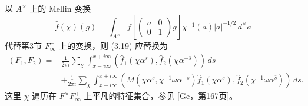 以 $A^\times$ 上的 Mellin 变换
\[
 \widehat f(\chi)(g)=\int_{A^\times}f\!\left[\begin{pmatrix}a&0\\0&1\end{pmatrix}g\right]
 \chi^{-1}(a)|a|^{-1/2}\,d^\times a
\]
代替第3节 $F_\infty^+$ 上的变换，则 (3.19) 应替换为
\begin{equation}
\begin{split}
 (F_1,F_2)={}&\frac1{2\pi i}\sum_\chi\int_{x-i\infty}^{x+i\infty}
 (\widehat f_1(\chi\alpha^s),\widehat f_2(\chi\alpha^{-\bar s}))\,ds\\
 &+\frac1{2\pi i}\sum_\chi\int_{x-i\infty}^{x+i\infty}
 (M(\chi\alpha^s,\chi^{-1}\omega\alpha^{-s})\widehat f_1(\chi\alpha^s),
 \widehat f_2(\chi^{-1}\omega\alpha^{\bar s}))\,ds.
\end{split}\tag{7.9}
\end{equation}
这里 $\chi$ 遍历在 $F^\times F_\infty^+$ 上平凡的特征集合，参见 [Ge，第167页]。

